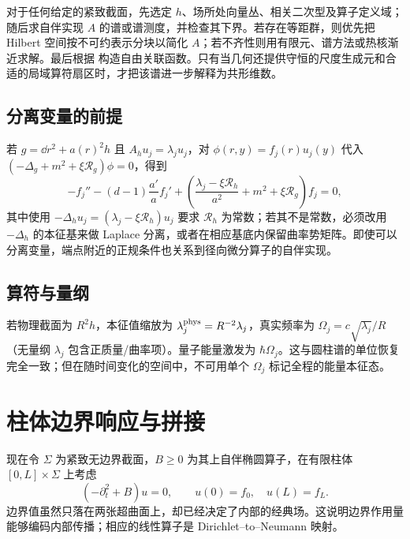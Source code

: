 对于任何给定的紧致截面，先选定 $h$、场所处向量丛、相关二次型及算子定义域；随后求自伴实现 $A$ 的谱或谱测度，并检查其下界。若存在等距群，则优先把 Hilbert 空间按不可约表示分块以简化 $A$；若不齐性则用有限元、谱方法或热核渐近求解。最后根据  构造自由关联函数。只有当几何还提供守恒的尺度生成元和合适的局域算符扇区时，才把该谱进一步解释为共形维数。

\subsection{分离变量的前提}

若 $g=\dd r^2+a(r)^2h$ 且 $A_hu_j=\lambda_ju_j$，对 $\phi(r,y)=f_j(r)u_j(y)$ 代入
$(-\Delta_g+m^2+\xi\mathcal R_g)\phi=0$，得到
\[
 -f_j''-(d-1)\frac{a'}a f_j'
 +\left(\frac{\lambda_j-\xi\mathcal R_h}{a^2}
 +m^2+\xi\mathcal R_g\right)f_j=0,
\]
其中使用 $-\Delta_hu_j=(\lambda_j-\xi\mathcal R_h)u_j$ 要求 $\mathcal R_h$ 为常数；若其不是常数，必须改用 $-\Delta_h$ 的本征基来做 Laplace 分离，或者在相应基底内保留曲率势矩阵。即使可以分离变量，端点附近的正规条件也关系到径向微分算子的自伴实现。

\subsection{算符与量纲}

若物理截面为 $R^2h$，本征值缩放为 $\lambda_j^{\rm phys}=R^{-2}\lambda_j$，真实频率为 $\Omega_j=c\sqrt{\lambda_j}/R$（无量纲 $\lambda_j$ 包含正质量/曲率项）。量子能量激发为 $\hbar\Omega_j$。这与圆柱谱的单位恢复完全一致；但在随时间变化的空间中，不可用单个 $\Omega_j$ 标记全程的能量本征态。

\section{柱体边界响应与拼接}

现在令 $\Sigma$ 为紧致无边界截面，$B\ge0$ 为其上自伴椭圆算子，在有限柱体 $[0,L]\times\Sigma$ 上考虑
\begin{equation}\label{eq:ghs-r6-cylinder-elliptic}
(-\partial_t^2+B)u=0,\qquad u(0)=f_0,\quad u(L)=f_L.
\end{equation}
边界值虽然只落在两张超曲面上，却已经决定了内部的经典场。这说明边界作用量能够编码内部传播；相应的线性算子是 Dirichlet--to--Neumann 映射。


